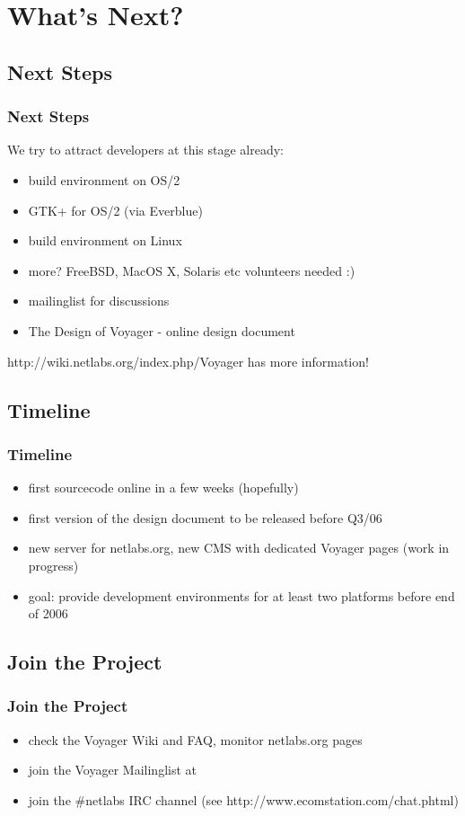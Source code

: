 \documentclass{beamer}
\begin{document}
\section{What's Next?}
\subsection{Next Steps}
\begin{frame}
\frametitle{Next Steps}
We try to attract developers at this stage already:
\begin{itemize}
  \item build environment on OS/2
  \item GTK+ for OS/2 (via Everblue)
  \item build environment on Linux
  \item more? FreeBSD, MacOS X, Solaris etc volunteers needed :)
  \item mailinglist for discussions
  \item The Design of Voyager - online design document
\end{itemize}
http://wiki.netlabs.org/index.php/Voyager has more information!
\end{frame}

\subsection{Timeline}
\begin{frame}
\frametitle{Timeline}
\begin{itemize}
  \item first sourcecode online in a few weeks (hopefully)
  \item first version of the design document to be released before Q3/06
  \item new server for netlabs.org, new CMS with dedicated Voyager pages (work in progress)
  \item goal: provide development environments for at least two platforms before end of 2006
\end{itemize}
\end{frame}

\subsection{Join the Project}
\begin{frame}
\frametitle{Join the Project}
\begin{itemize}
  \item check the Voyager Wiki and FAQ, monitor netlabs.org pages
  \item join the Voyager Mailinglist at
  \item join the \#netlabs IRC channel (see http://www.ecomstation.com/chat.phtml)
\end{itemize}
\end{frame}
\end{document}
